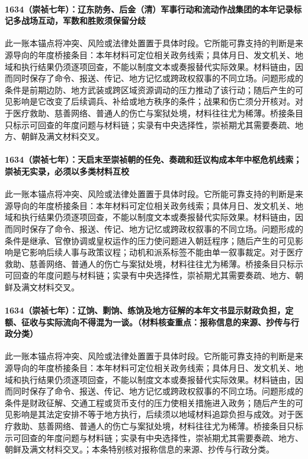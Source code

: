 \paragraph{1634（崇祯七年）：辽东防务、后金（清）军事行动和流动作战集团的本年记录标记多战场互动，军数和胜败须保留分歧} 此一账本锚点将冲突、风险或法律处置置于具体时段。它所能可靠支持的判断是来源导向的年度桥接条目：本年材料可定位相关政务线索；具体月日、发文机关、地域和执行结果仍须逐项回查，不能以制度文本或奏报替代实际效果。材料链由，因而同时保存了命令、报送、传记、地方记忆或跨政权叙事的不同立场。问题形成的条件是前期边防、地方武装或跨区域资源调动的压力推动了该行动；随后产生的可见影响是它改变了后续调兵、补给或地方秩序的条件；战果和伤亡须分开核对。对于医疗救助、慈善网络、普通人的伤亡与案狱处境，材料往往尤为稀薄。桥接条目只标示可回查的年度问题与材料链；实录有中央选择性，崇祯期尤其需要奏疏、地方、朝鲜及满文材料交叉。

\paragraph{1634（崇祯七年）：天启末至崇祯朝的任免、奏疏和廷议构成本年中枢危机线索；崇祯无实录，必须以多类材料互校} 此一账本锚点将冲突、风险或法律处置置于具体时段。它所能可靠支持的判断是来源导向的年度桥接条目：本年材料可定位相关政务线索；具体月日、发文机关、地域和执行结果仍须逐项回查，不能以制度文本或奏报替代实际效果。材料链由，因而同时保存了命令、报送、传记、地方记忆或跨政权叙事的不同立场。问题形成的条件是继承、官僚协调或皇权运作的压力使问题进入朝廷程序；随后产生的可见影响是它影响后续人事与政策议程；动机和派系标签不能由单一叙事裁定。对于医疗救助、慈善网络、普通人的伤亡与案狱处境，材料往往尤为稀薄。桥接条目只标示可回查的年度问题与材料链；实录有中央选择性，崇祯期尤其需要奏疏、地方、朝鲜及满文材料交叉。

\paragraph{1634（崇祯七年）：辽饷、剿饷、练饷及地方征解的本年文书显示财政负担，定额、征收与实际流向不得混为一谈。（材料核查重点：报称信息的来源、抄传与行政分类）} 此一账本锚点将冲突、风险或法律处置置于具体时段。它所能可靠支持的判断是来源导向的年度桥接条目：本年材料可定位相关政务线索；具体月日、发文机关、地域和执行结果仍须逐项回查，不能以制度文本或奏报替代实际效果。材料链由，因而同时保存了命令、报送、传记、地方记忆或跨政权叙事的不同立场。问题形成的条件是财政征解、交通工程或货币支付的压力使相关措施进入政务；随后产生的可见影响是其法定安排不等于地方执行，后续须以地域材料追踪负担与成效。对于医疗救助、慈善网络、普通人的伤亡与案狱处境，材料往往尤为稀薄。桥接条目只标示可回查的年度问题与材料链；实录有中央选择性，崇祯期尤其需要奏疏、地方、朝鲜及满文材料交叉。；本条特别核对报称信息的来源、抄传与行政分类。

